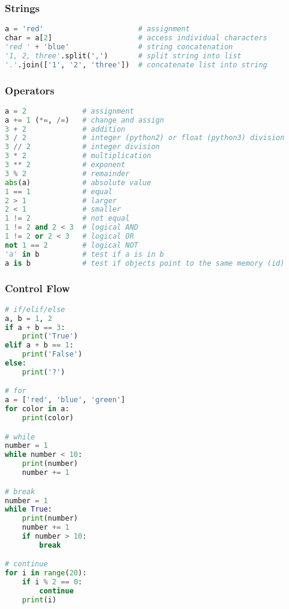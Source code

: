 \documentclass[]{article}
\begin{document}
\subsubsection{Strings}\label{strings}

\begin{lstlisting}[language=Python]
a = 'red'                      # assignment
char = a[2]                    # access individual characters
'red ' + 'blue'                # string concatenation
'1, 2, three'.split(',')       # split string into list
'.'.join(['1', '2', 'three'])  # concatenate list into string
\end{lstlisting}

\subsubsection{Operators}\label{operators}

\begin{lstlisting}[language=Python]
a = 2             # assignment
a += 1 (*=, /=)   # change and assign
3 + 2             # addition
3 / 2             # integer (python2) or float (python3) division
3 // 2            # integer division
3 * 2             # multiplication
3 ** 2            # exponent
3 % 2             # remainder
abs(a)            # absolute value
1 == 1            # equal
2 > 1             # larger
2 < 1             # smaller
1 != 2            # not equal
1 != 2 and 2 < 3  # logical AND
1 != 2 or 2 < 3   # logical OR
not 1 == 2        # logical NOT
'a' in b          # test if a is in b
a is b            # test if objects point to the same memory (id)
\end{lstlisting}

\subsubsection{Control Flow}\label{control-flow}

\begin{lstlisting}[language=Python]
# if/elif/else
a, b = 1, 2
if a + b == 3:
    print('True')
elif a + b == 1:
    print('False')
else:
    print('?')

# for
a = ['red', 'blue', 'green']
for color in a:
    print(color)

# while
number = 1
while number < 10:
    print(number)
    number += 1

# break
number = 1
while True:
    print(number)
    number += 1
    if number > 10:
        break

# continue
for i in range(20):
    if i % 2 == 0:
        continue
    print(i)
\end{lstlisting}
\end{document}

